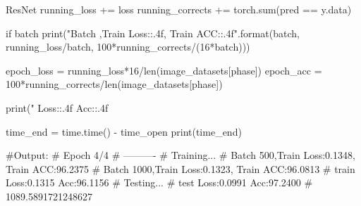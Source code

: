 \documentclass[openbib]{article}
\begin{document}
\begin{Python}{ResNet}
		running_loss += loss
		running_corrects += torch.sum(pred == y.data)
	
		if batch%
			print("Batch {},Train Loss:{:.4f}, Train ACC:{:.4f}".format(batch, running_loss/batch,
			100*running_corrects/(16*batch)))
			
	epoch_loss = running_loss*16/len(image_datasets[phase])
	epoch_acc = 100*running_corrects/len(image_datasets[phase])

	print("{} Loss:{:.4f} Acc:{:.4f}%

time_end = time.time() - time_open
print(time_end)

#Output:
#		Epoch 4/4
#		----------
#		Training...
#		Batch 500,Train Loss:0.1348, Train ACC:96.2375
#		Batch 1000,Train Loss:0.1323, Train ACC:96.0813
#		train Loss:0.1315 Acc:96.1156%
#		Testing...
#		test Loss:0.0991 Acc:97.2400%
#		1089.5891721248627

\end{Python}
\end{document}
